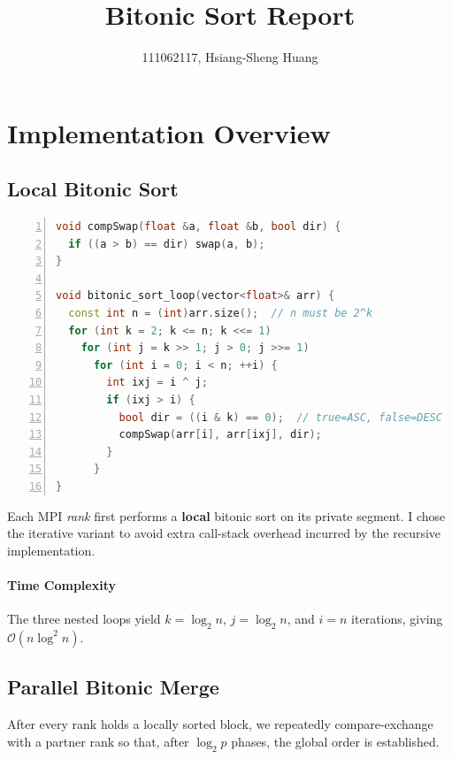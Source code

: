 \documentclass{article}
\title{Bitonic Sort Report}
\author{111062117, Hsiang-Sheng Huang}
\begin{document}
\maketitle


\section*{Implementation Overview}
\subsection*{Local Bitonic Sort}
\begin{lstlisting}[language=C++, basicstyle=\ttfamily\small, keywordstyle=\color{blue}\bfseries, commentstyle=\color{gray}\itshape, stringstyle=\color{red}, numbers=left, numberstyle=\tiny\color{gray}, stepnumber=1, frame=single, showstringspaces=false, breaklines=true]
void compSwap(float &a, float &b, bool dir) {
  if ((a > b) == dir) swap(a, b);
}

void bitonic_sort_loop(vector<float>& arr) {
  const int n = (int)arr.size();  // n must be 2^k
  for (int k = 2; k <= n; k <<= 1)
    for (int j = k >> 1; j > 0; j >>= 1)
      for (int i = 0; i < n; ++i) {
        int ixj = i ^ j;
        if (ixj > i) {
          bool dir = ((i & k) == 0);  // true=ASC, false=DESC
          compSwap(arr[i], arr[ixj], dir);
        }
      }
}
\end{lstlisting}

Each MPI \emph{rank} first performs a \textbf{local} bitonic sort on its private segment. I chose the iterative variant to avoid extra call-stack overhead incurred by the recursive implementation.

\paragraph{Time Complexity}
The three nested loops yield $k = \log_2 n$, $j = \log_2 n$, and $i = n$ iterations, giving
$\mathcal{O}(n\log^2 n)$.

\subsection*{Parallel Bitonic Merge}
After every rank holds a locally sorted block, we repeatedly compare-exchange with a partner rank so that, after $\log_2 p$ phases, the global order is established.
\end{document}
